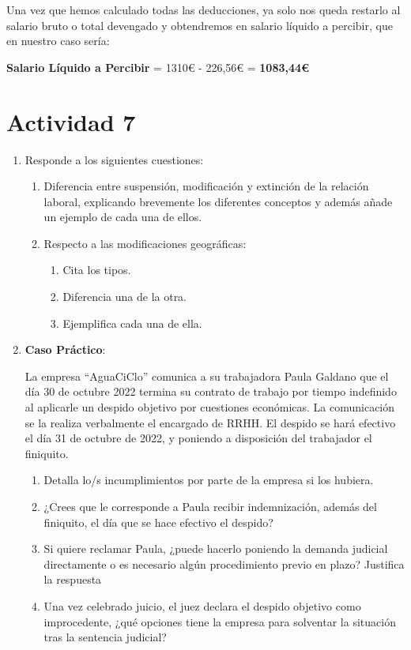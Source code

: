 \begin{itemize}
    Una vez que hemos calculado todas las deducciones, ya solo nos queda restarlo al salario bruto o total devengado y obtendremos en salario líquido a percibir, que en nuestro caso sería:

       \vspace{3ex}
       \centering\textbf{Salario Líquido a Percibir} = 1310€ - 226,56€ = \textbf{1083,44€}

\end{itemize}

\section{Actividad 7}
\begin{enumerate}
    \item Responde a los siguientes cuestiones:
    \begin{enumerate}
        \item Diferencia entre suspensión, modificación y extinción de la relación laboral, explicando brevemente los diferentes conceptos y además añade un ejemplo de cada una de ellos.
        \item Respecto a las modificaciones geográficas:
        \begin{enumerate}
            \item Cita los tipos.
            \item Diferencia una de la otra.
            \item Ejemplifica cada una de ella.
        \end{enumerate}
    \end{enumerate}

    \item \textbf{Caso Práctico}:

    La empresa ``AguaCiClo'' comunica a su trabajadora Paula Galdano que el día 30 de octubre 2022 termina su contrato de trabajo por tiempo indefinido al aplicarle un despido objetivo por cuestiones económicas. La comunicación se la realiza verbalmente el encargado de RRHH.  El despido se hará efectivo el día 31 de octubre de 2022, y poniendo a disposición del trabajador el finiquito.

    \begin{enumerate}
        \item Detalla lo/s incumplimientos por parte de la empresa si los hubiera.
        \item ¿Crees que  le corresponde a Paula recibir indemnización, además del finiquito, el día que se hace efectivo el despido?
        \item Si quiere reclamar Paula, ¿puede hacerlo poniendo la demanda judicial directamente o es necesario algún procedimiento previo en plazo? Justifica la respuesta
        \item Una vez celebrado juicio, el juez declara el despido objetivo como improcedente, ¿qué opciones tiene la empresa para solventar la situación tras la sentencia judicial?
    \end{enumerate}
\end{enumerate}

